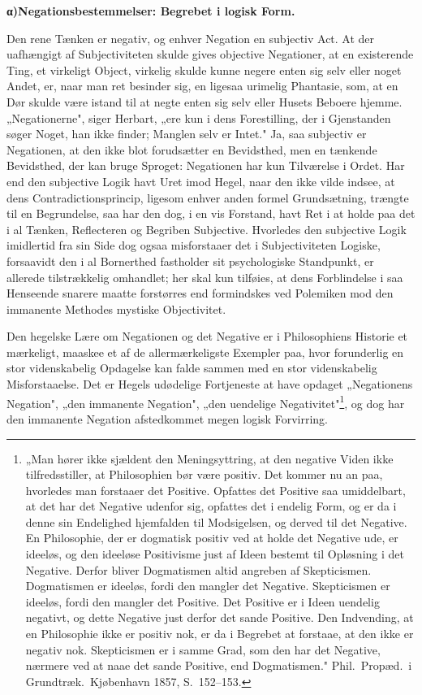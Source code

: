 \documentclass[12pt]{book}
\newcommand{\opage}[1]{\marginnote{\footnotesize\textit{[#1]}}}
\begin{document}
\begin{center}{\bfseries α)\quad Negationsbestemmelser: Begrebet i logisk Form.}\end{center}

Den rene Tænken er negativ, og enhver Negation en subjectiv Act. At der uafhængigt af
Subjectiviteten skulde gives objective Negationer, at en existerende Ting, et virkeligt
Object, virkelig skulde kunne negere enten sig selv eller noget Andet, er, naar man ret
besinder sig, en ligesaa urimelig Phantasie, som, at en Dør skulde være istand til at negte
enten sig selv eller Husets Beboere hjemme. „Negationerne", siger Herbart, „ere kun i dens
Forestilling, der i Gjenstanden søger Noget, han ikke finder; Manglen selv er Intet." Ja, saa
subjectiv er Negationen, at den ikke blot forudsætter en Bevidsthed, men en tænkende
Bevidsthed, der kan bruge Sproget: Negationen har kun Tilværelse i Ordet. Har end den
subjective Logik havt Uret imod Hegel, naar den ikke vilde indsee, at dens
Contradictionsprincip, ligesom enhver anden formel Grundsætning, trængte til en Begrundelse,
saa har den dog, i en vis Forstand, havt Ret i at holde paa det i al Tænken, Reflecteren og
Begriben Subjective. Hvorledes den subjective Logik imidlertid fra sin Side dog ogsaa
misforstaaer det i Subjectiviteten Logiske, forsaavidt den i al Bornerthed fastholder sit
psychologiske Standpunkt, er allerede tilstrækkelig omhandlet; her skal kun tilføies, at dens
Forblindelse i saa Henseende snarere maatte forstørres end formindskes ved Polemiken mod den
immanente Methodes mystiske Objectivitet.

\opage{147} Den hegelske Lære om Negationen og det Negative er i Philosophiens Historie et mærkeligt,
maaskee et af de allermærkeligste Exempler paa, hvor forunderlig en stor videnskabelig
Opdagelse kan falde sammen med en stor videnskabelig Misforstaaelse. Det er Hegels udødelige
Fortjeneste at have opdaget „Negationens Negation", „den immanente Negation", „den uendelige
Negativitet"\footnote{„Man hører ikke sjældent den Meningsyttring, at den negative Viden ikke
tilfredsstiller, at Philosophien bør være positiv. Det kommer nu an paa, hvorledes man
forstaaer det Positive. Opfattes det Positive saa umiddelbart, at det har det Negative udenfor
sig, opfattes det i endelig Form, og er da i denne sin Endelighed hjemfalden til Modsigelsen,
og derved til det Negative. En Philosophie, der er dogmatisk positiv ved at holde det Negative
ude, er ideeløs, og den ideeløse Positivisme just af Ideen bestemt til Opløsning i det
Negative. Derfor bliver Dogmatismen altid angreben af Skepticismen. Dogmatismen er ideeløs,
fordi den mangler det Negative. Skepticismen er ideeløs, fordi den mangler det Positive. Det
Positive er i Ideen uendelig negativt, og dette Negative just derfor det sande Positive. Den
Indvending, at en Philosophie ikke er positiv nok, er da i Begrebet at forstaae, at den ikke
er negativ nok. Skepticismen er i samme Grad, som den har det Negative, nærmere ved at naae
det sande Positive, end Dogmatismen." Phil.\ Propæd.\ i Grundtræk.\ Kjøbenhavn 1857,
S.~152--153.}, og dog har den immanente Negation afstedkommet megen logisk Forvirring.
\end{document}
